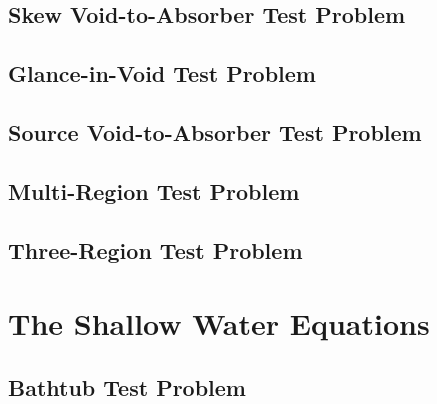 \subsection{Skew Void-to-Absorber Test Problem\label{sec:skew_void_to_absorber}}
  
\subsection{Glance-in-Void Test Problem\label{sec:glance_in_void}}
  
\subsection{Source Void-to-Absorber Test Problem\label{sec:source_void_to_absorber}}
  
\subsection{Multi-Region Test Problem\label{sec:multi_region}}
  
\subsection{Three-Region Test Problem\label{sec:three_region}}
  
\section{The Shallow Water Equations\label{sec:shallow_water_results}}
\subsection{Bathtub Test Problem\label{sec:bathtub}}
  
